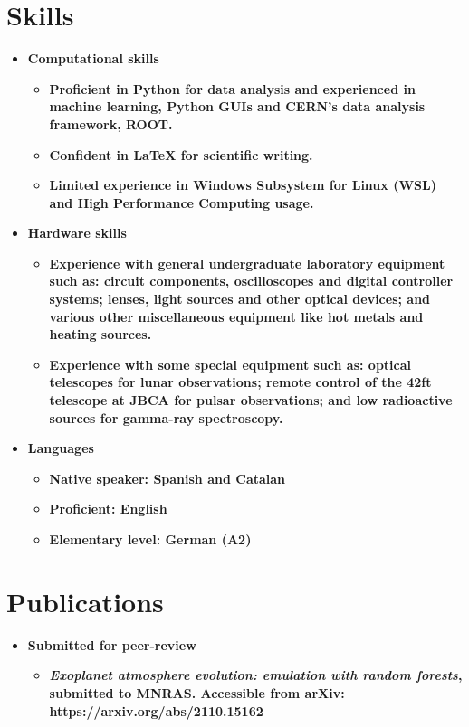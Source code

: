 \documentclass[letterpaper,11pt]{article}
\newcommand{\resumeItem}[2]{
  \item\small{
    \textbf{#1}{ #2 \vspace{-2pt}}
  }
}
\newcommand{\resumeItemListStart}{\begin{itemize}}
\newcommand{\resumeItemListEnd}{\end{itemize}\vspace{-5pt}}
\begin{document}

\section{Skills}
\begin{itemize}[leftmargin=*]
\item \textbf{Computational skills} \vspace{-5pt}
\resumeItemListStart
\resumeItem
{\normalfont Proficient in Python for data analysis and experienced in machine learning, Python GUIs and CERN's data analysis framework, ROOT.}{}
\resumeItem
{\normalfont Confident in LaTeX for scientific writing.}{}
\resumeItem
{\normalfont Limited experience in Windows Subsystem for Linux (WSL) and High Performance Computing usage.}{}
\resumeItemListEnd
\end{itemize}

\begin{itemize}[leftmargin=*]
\item \textbf{Hardware skills} \vspace{-5pt}
\resumeItemListStart
\resumeItem
{\normalfont Experience with general undergraduate laboratory equipment such as: circuit components, oscilloscopes and digital controller systems; lenses, light sources and other optical devices; and various other miscellaneous equipment like hot metals and heating sources.}{}
\resumeItem
{\normalfont Experience with some special equipment such as: optical telescopes for lunar observations; remote control of the 42ft telescope at JBCA for pulsar observations; and low radioactive sources for gamma-ray spectroscopy.}{}
\resumeItemListEnd
\end{itemize}

\begin{itemize}[leftmargin=*]
\item \textbf{Languages} \vspace{-5pt}
\resumeItemListStart
\resumeItem
{\normalfont Native speaker: Spanish and Catalan}{}
\resumeItem
{\normalfont Proficient: English}{}
\resumeItem
{\normalfont Elementary level: German (A2)}{}
\resumeItemListEnd
\end{itemize}


\section{Publications}
\begin{itemize}[leftmargin=*]
\item \textbf{Submitted for peer-review} \vspace{-5pt}
\resumeItemListStart
\resumeItem
{\normalfont \textit{Exoplanet atmosphere evolution: emulation with random forests}, submitted to MNRAS. Accessible from arXiv: https://arxiv.org/abs/2110.15162}{}
\resumeItemListEnd
\end{itemize}
\end{document}
